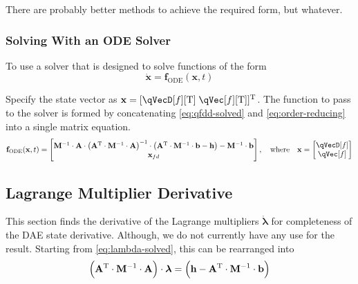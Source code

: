 \documentclass[11pt]{article}
\begin{document}
There are probably better methods to achieve the required form, but whatever.


\subsubsection{Solving With an ODE Solver} \label{sssec:d:fwdDyn:ODE}
To use a solver that is designed to solve functions of the form
\begin{equation}
    \dot{\mathbf{x}} = \mathbf{f}_{\mathrm{ODE}}(\mathbf{x},t)
\end{equation}

Specify the state vector as $\mathbf{x} = [\qVecD[f][\mathrm{T}] \; \qVec[f][\mathrm{T}]]^{\mathrm{T}}$. The function to pass to the solver is formed by concatenating \eqref{eq:qfdd-solved} and \eqref{eq:order-reducing} into a single matrix equation.
\begin{equation}
    \mathbf{f}_{\mathrm{ODE}}(\mathbf{x},t) =
    \begin{bmatrix}
        \mathbf{M}^{-1} \cdot \mathbf{A} \cdot
        \del{\mathbf{A}^{\mathrm{T}} \cdot \mathbf{M}^{-1} \cdot \mathbf{A}}^{-1} \cdot
        \del{\mathbf{A}^{\mathrm{T}} \cdot \mathbf{M}^{-1} \cdot \mathbf{b} - \mathbf{h}}
        - \mathbf{M}^{-1} \cdot \mathbf{b} \\
        \mathbf{x}_{fd}
    \end{bmatrix}
    ,\quad \mathrm{where} \quad
    \mathbf{x} = \begin{bmatrix} \qVecD[f] \\ \qVec[f] \end{bmatrix}
\end{equation}


\subsection{Lagrange Multiplier Derivative} \label{sssec:d:lambdaD}
This section finds the derivative of the Lagrange multipliers $\dot{\bm{\lambda}}$ for completeness of the DAE state derivative. Although, we do not currently have any use for the result. Starting from \eqref{eq:lambda-solved}, this can be rearranged into
\begin{equation}
    \del{\mathbf{A}^{\mathrm{T}} \cdot \mathbf{M}^{-1} \cdot \mathbf{A}} \cdot \bm{\lambda} =
        \del{\mathbf{h} - \mathbf{A}^{\mathrm{T}} \cdot \mathbf{M}^{-1} \cdot \mathbf{b}}
\end{equation}
\end{document}
